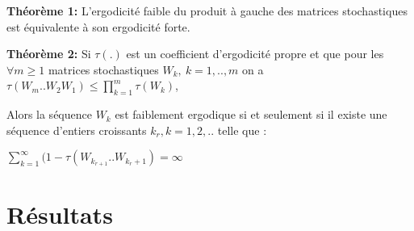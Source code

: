 \documentclass{beamer}
\begin{document}
\begin{frame}
	\textbf{Théorème 1:}
		L'ergodicité faible du produit à gauche des matrices stochastiques est équivalente à son ergodicité forte.
	\bigbreak
	
	\pause

	\textbf{Théorème 2:}
		Si $\tau(.)$ est un coefficient d'ergodicité propre et que pour les $\forall m \geq 1$ matrices stochastiques $W_k,\ k=1,..,m$ on a $\tau(W_m .. W_2W_1) \leq \prod_{k=1}^m\tau(W_k)$,
		
	\pause	
	\bigbreak		
		
		Alors la séquence $W_k$ est faiblement ergodique si et seulement si il existe une séquence d'entiers croissants $k_r, k=1,2,..$ telle que :

			\bigbreak
			
			$\sum_{k=1}^{\infty}(1 - \tau(W_{k_{r+1}}..W_{k_r + 1}) = \infty$

\end{frame}

\section{Résultats}
	
\end{document}
